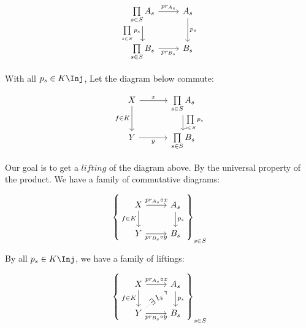 \begin{prf}
            \[\begin{tikzcd}
                {\prod\limits_{s \in S} A_s} & {A_s} \\
                {\prod\limits_{s \in S} B_s} & {B_s}
                \arrow["{\prod\limits_{s\in S}p_s}"', from=1-1, to=2-1]
                \arrow["{pr_{A_s}}", from=1-1, to=1-2]
                \arrow["{pr_{B_s}}"', from=2-1, to=2-2]
                \arrow["{p_s}", from=1-2, to=2-2]
            \end{tikzcd}\]

            With all $p_s \in K \Inj$, Let the diagram below commute:

            \[\begin{tikzcd}[column sep = 1.15cm]
                X & {\prod\limits_{s \in S} A_s} \\
                Y & {\prod\limits_{s \in S} B_s}
                \arrow["{\prod\limits_{s\in S}p_s}", from=1-2, to=2-2]
                \arrow["x", from=1-1, to=1-2]
                \arrow["y"', from=2-1, to=2-2]
                \arrow["{f \in K}"', from=1-1, to=2-1]
            \end{tikzcd}\]

            \par Our goal is to get a $lifting$ of the diagram above.
            By the universal property of the product. We have a family of commutative diagrams:

            \[ \left\{
            \begin{tikzcd}
                X & {A_s} \\
                Y & {B_s}
                \arrow["{f \in K}"', from=1-1, to=2-1]
                \arrow["{p_s}", from=1-2, to=2-2]
                \arrow["{pr_{B_s} \circ y}"', from=2-1, to=2-2]
                \arrow["{pr_{A_s} \circ x}", from=1-1, to=1-2]
            \end{tikzcd}
            \right\}_{s \in S} \]

            By all $p_s \in K \Inj$, we have a family of liftings:

            \[ \left\{
            \begin{tikzcd}
                X & {A_s} \\
                Y & {B_s}
                \arrow["{f \in K}"', from=1-1, to=2-1]
                \arrow["{p_s}", from=1-2, to=2-2]
                \arrow["{pr_{B_s} \circ y}"', from=2-1, to=2-2]
                \arrow["{pr_{A_s} \circ x}", from=1-1, to=1-2]
                \arrow["{\E\ l_s}"{marking}, dotted, from=2-1, to=1-2]
            \end{tikzcd}
            \right\}_{s \in S} \]


\end{prf}
